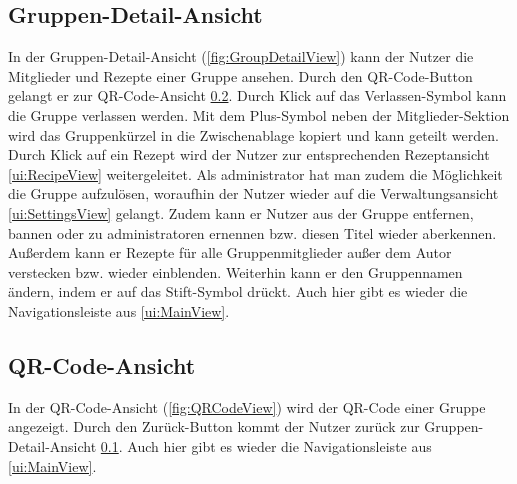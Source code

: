 \documentclass[parskip=full]{scrartcl}
\begin{document}
\subsection{Gruppen-Detail-Ansicht}
\label{ui:GroupDetailView}

In der Gruppen-Detail-Ansicht (\autoref{fig:GroupDetailView}) kann der Nutzer die Mitglieder und Rezepte einer Gruppe ansehen. Durch den QR-Code-Button gelangt er zur QR-Code-Ansicht \ref{ui:QRCodeView}. Durch Klick auf das Verlassen-Symbol kann die Gruppe verlassen werden. Mit dem Plus-Symbol neben der Mitglieder-Sektion wird das Gruppenkürzel in die Zwischenablage kopiert und kann geteilt werden. Durch Klick auf ein Rezept wird der Nutzer zur entsprechenden Rezeptansicht \ref{ui:RecipeView} weitergeleitet. Als \Gls{administrator} hat man zudem die Möglichkeit die Gruppe aufzulösen, woraufhin der Nutzer wieder auf die Verwaltungsansicht \ref{ui:SettingsView} gelangt. Zudem kann er Nutzer aus der Gruppe entfernen, bannen oder zu \Gls{administrator}en ernennen bzw. diesen Titel wieder aberkennen. Außerdem kann er Rezepte für alle Gruppenmitglieder außer dem Autor verstecken bzw. wieder einblenden. Weiterhin kann er den Gruppennamen ändern, indem er auf das Stift-Symbol drückt. Auch hier gibt es wieder die Navigationsleiste aus \ref{ui:MainView}.


\subsection{QR-Code-Ansicht}
\label{ui:QRCodeView}
In der QR-Code-Ansicht (\autoref{fig:QRCodeView}) wird der QR-Code einer Gruppe angezeigt. Durch den Zurück-Button kommt der Nutzer zurück zur Gruppen-Detail-Ansicht \ref{ui:GroupDetailView}. Auch hier gibt es wieder die Navigationsleiste aus \ref{ui:MainView}.
\newpage
\end{document}
